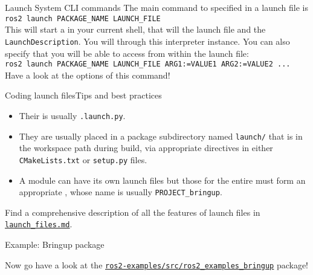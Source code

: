 \begin{frame}{Launch System CLI commands}
  The main command to  specified in a launch file is\\
  \bigskip
  \texttt{ros2 launch PACKAGE\_NAME LAUNCH\_FILE}\\
  \bigskip
  This will start a  in your current shell, that will  the launch file and  the \texttt{LaunchDescription}. You will  through this interpreter instance. You can also specify  that you will be able to access from within the launch file:\\
  \bigskip
  \texttt{ros2 launch PACKAGE\_NAME LAUNCH\_FILE ARG1:=VALUE1 ARG2:=VALUE2 ...}\\
  \bigskip
  Have a look at the options of this command!
\end{frame}

\begin{frame}{Coding launch files}{Tips and best practices}
	\begin{itemize}
		\item Their  is usually \texttt{.launch.py}.
		\item They are usually placed in a package subdirectory named \texttt{launch/} that is  in the workspace path during build, via appropriate directives in either \texttt{CMakeLists.txt} or \texttt{setup.py} files.
		\item A module can have its own launch files but those for the entire  must form an appropriate , whose name is usually \texttt{PROJECT\_bringup}.
	\end{itemize}
	\begin{block}{}
		\centering
		Find a comprehensive description of all the features of launch files in \href{https://github.com/IntelligentSystemsLabUTV/ros2-examples/blob/humble/launch_files.md}{\color{blue}\underline{\texttt{launch\_files.md}}}.
	\end{block}
\end{frame}

\begin{frame}{Example: Bringup package}
  \begin{block}{}
    \centering
	  Now go have a look at the \href{https://github.com/IntelligentSystemsLabUTV/ros2-examples/tree/humble/src/ros2_examples_bringup}{\color{blue}\underline{\texttt{ros2-examples/src/ros2\_examples\_bringup}}} package!
  \end{block}
\end{frame}
